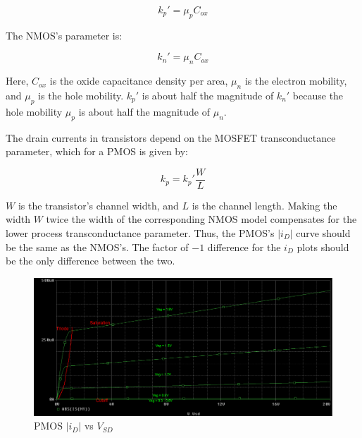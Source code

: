 \begin{equation}
	\label{eq:pmos_trans}
	k_p' = \mu _{p} C_{ox}
\end{equation}

The NMOS's parameter is:

\begin{equation}
	\label{eq:nmos_trans}
	k_n' = \mu _{n} C_{ox}
\end{equation}

Here, $C_{ox}$ is the oxide capacitance density per area, $\mu _{n}$ is the electron mobility, and $\mu _{p}$ is the hole mobility. $k_p'$ is about half the magnitude of $k_n'$ because the hole mobility $\mu _{p}$ is about half the magnitude of $\mu _{n}$.

The drain currents in transistors depend on the MOSFET transconductance parameter, which for a PMOS is given by:

\begin{equation}
	\label{eq:pmos_fettrans}
	k_p = k_p' \frac{W}{L}
\end{equation}


$W$ is the transistor's channel width, and $L$ is the channel length. Making the width $W$ twice the width of the corresponding NMOS model compensates for the lower process transconductance parameter. Thus, the PMOS's $|i_D|$ curve should be the same as the NMOS's. The factor of $-1$ difference for the $i_D$ plots should be the only difference between the two.

\FloatBarrier

\begin{figure}[h!]
	\centering
	\includegraphics[scale=0.25]{./images/circuit2_vsd_sweep_abs.PNG}
	\caption{PMOS $|i_D|$ vs $V_{SD}$}
	\label{fig:circuit2_vsd_sweep_abs}
\end{figure}

\FloatBarrier


